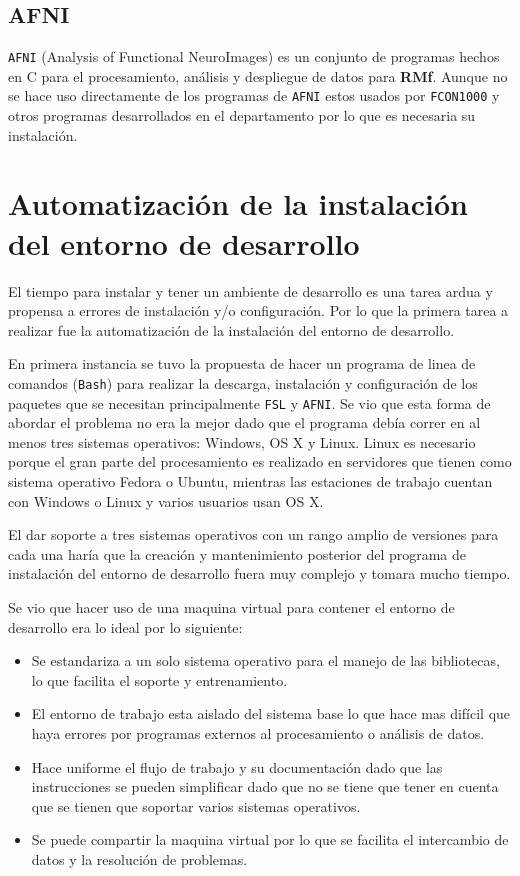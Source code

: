 \documentclass{article}
\begin{document}
\subsection{AFNI}

\texttt{AFNI} (Analysis of Functional NeuroImages) es un conjunto de programas hechos en C para el procesamiento, análisis y despliegue de datos para \textbf{RMf}. Aunque no se hace uso directamente de
los programas de \texttt{AFNI} estos usados por \texttt{FCON1000} y otros programas desarrollados en el departamento por lo que es necesaria su instalación.

\section{Automatización de la instalación del entorno de desarrollo}
El tiempo para instalar y tener un ambiente de desarrollo es una tarea ardua y propensa a errores de instalación y/o configuración. Por lo que la primera tarea a realizar fue la automatización de la instalación del entorno de desarrollo.

En primera instancia se tuvo la propuesta de hacer un programa de linea de comandos (\texttt{Bash}) para realizar la descarga, instalación y configuración de los paquetes que se necesitan principalmente \texttt{FSL} y \texttt{AFNI}. Se vio que esta forma de abordar el problema no era la mejor dado que el programa debía correr en al menos tres sistemas operativos: Windows, OS X y Linux. Linux es necesario porque el gran parte del procesamiento es realizado en servidores que tienen como sistema operativo Fedora o Ubuntu, mientras las estaciones de trabajo cuentan con Windows o Linux y varios usuarios usan OS X.

El dar soporte a tres sistemas operativos con un rango amplio de versiones para cada una haría que la creación y mantenimiento posterior del programa de instalación del entorno de desarrollo fuera muy complejo y tomara mucho tiempo.

Se vio que hacer uso de una maquina virtual para contener el entorno de desarrollo era lo ideal por lo siguiente:

\begin{itemize}
\item Se estandariza a un solo sistema operativo para el manejo de las bibliotecas,
  lo que facilita el soporte y entrenamiento.
\item El entorno de trabajo esta aislado del sistema base lo que hace mas difícil que haya errores por programas externos al procesamiento o análisis de datos.
\item Hace uniforme el flujo de trabajo y su documentación dado que las instrucciones se pueden simplificar dado que no se tiene que tener en cuenta que se tienen que soportar varios sistemas operativos.
\item Se puede compartir la maquina virtual por lo que se facilita el intercambio de datos y la resolución de problemas.
\end{itemize}
\end{document}
